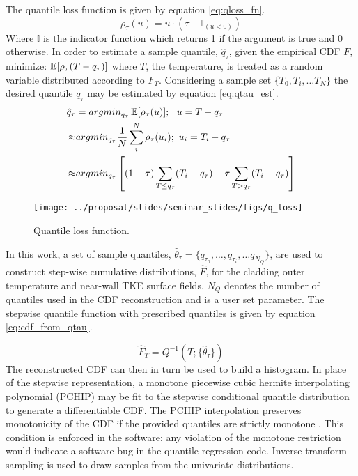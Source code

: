 The quantile loss function is given by equation \ref{eq:qloss_fn}.
\begin{equation}
\rho_\tau( u) =  u \cdot (\tau - \mathbb{I}_{( u < 0)})
\label{eq:qloss_fn}
\end{equation}
Where $\mathbb{I}$ is the indicator function which returns 1 if the argument is true and 0 otherwise.
In order to estimate a sample quantile, $\hat q_\tau$, given the empirical CDF $F$, minimize: $\operatorname*{\mathbb{E}}[\rho_\tau(T - q_\tau)]$ where $T$, the temperature, is treated as a random variable distributed according to $F_T$.  Considering a sample set $\{T_0, T_i, \dots T_N \}$ the desired quantile $q_\tau$ may be estimated by equation \ref{eq:qtau_est}.
\begin{equation}
            \left.\begin{aligned}
            \hat q_{\tau} &= argmin_{q_\tau} \operatorname*{\mathbb{E}}[\rho_\tau(u)];\ \  u = T - q_\tau  \\
            \approx & argmin_{q_\tau}  \frac{1}{N} \sum_i^N \rho_\tau(u_i); \ u_i = T_i - q_\tau \\
            \approx & argmin_{q_\tau} \left[ (1-\tau) \sum_{T \leq q_\tau}( T_i - q_\tau ) - \tau \sum_{T > q_\tau} (T_i - q_\tau) \right]
            \end{aligned}\right.
            \label{eq:qtau_est}
\end{equation}

\begin{figure}[H]
    \centering
    \texttt{[image: ../proposal/slides/seminar\_slides/figs/q\_loss]}
    \caption[Quantile loss function.]{Quantile loss function.}
    \label{fig:qloss}
\end{figure}

In this work, a set of sample quantiles, $\hat \theta_\tau = \{q_{\tau_0}, \dots, q_{\tau_i}, \dots q_{N_Q} \}$, are used to construct step-wise cumulative distributions, $\hat F$, for the cladding outer temperature and near-wall TKE surface fields.  $N_Q$ denotes the number of quantiles used in the CDF reconstruction and is a user set parameter. The stepwise quantile function with prescribed quantiles is given by equation \ref{eq:cdf_from_qtau}.

\begin{equation}
\hat F_{T}= Q^{-1}(T; \{\hat{\theta}_{\tau} \})
\label{eq:cdf_from_qtau}
\end{equation}
The reconstructed CDF can then in turn be used to build a histogram.  In place of the stepwise representation, a monotone piecewise cubic hermite interpolating polynomial (PCHIP) may be fit to the stepwise conditional quantile distribution to generate a differentiable CDF.
The PCHIP interpolation preserves monotonicity of the CDF if the provided quantiles are strictly monotone \cite{Fritsch80}.  This condition is enforced in the software; any violation of the monotone restriction would indicate a software bug in the quantile regression code.  Inverse transform sampling is used to draw samples from the univariate distributions.

